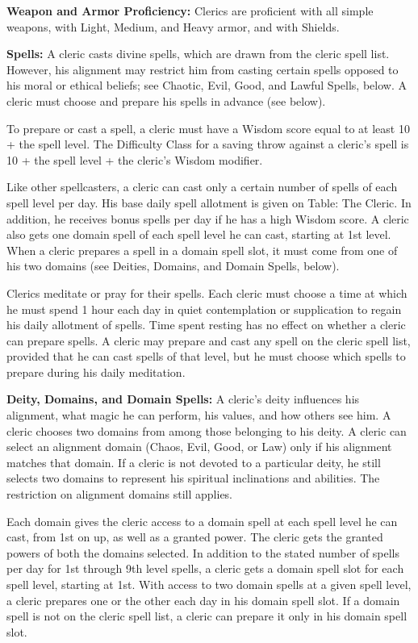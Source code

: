 \classfeatures

\textbf{Weapon and Armor Proficiency:} Clerics are proficient with all simple weapons, with Light, Medium, and Heavy armor, and with Shields.

\textbf{Spells:} A cleric casts divine spells, which are drawn from the cleric spell list. However, his alignment may restrict him from casting certain spells opposed to his moral or ethical beliefs; see Chaotic, Evil, Good, and Lawful Spells, below. A cleric must choose and prepare his spells in advance (see below).

To prepare or cast a spell, a cleric must have a Wisdom score equal to at least 10 + the spell level. The Difficulty Class for a saving throw against a cleric's spell is 10 + the spell level + the cleric's Wisdom modifier.

Like other spellcasters, a cleric can cast only a certain number of spells of each spell level per day. His base daily spell allotment is given on Table: The Cleric. In addition, he receives bonus spells per day if he has a high Wisdom score. A cleric also gets one domain spell of each spell level he can cast, starting at 1st level. When a cleric prepares a spell in a domain spell slot, it must come from one of his two domains (see Deities, Domains, and Domain Spells, below).

Clerics meditate or pray for their spells. Each cleric must choose a time at which he must spend 1 hour each day in quiet contemplation or supplication to regain his daily allotment of spells. Time spent resting has no effect on whether a cleric can prepare spells. A cleric may prepare and cast any spell on the cleric spell list, provided that he can cast spells of that level, but he must choose which spells to prepare during his daily meditation.

\textbf{Deity, Domains, and Domain Spells:} A cleric's deity influences his alignment, what magic he can perform, his values, and how others see him. A cleric chooses two domains from among those belonging to his deity. A cleric can select an alignment domain (Chaos, Evil, Good, or Law) only if his alignment matches that domain. If a cleric is not devoted to a particular deity, he still selects two domains to represent his spiritual inclinations and abilities. The restriction on alignment domains still applies.

Each domain gives the cleric access to a domain spell at each spell level he can cast, from 1st on up, as well as a granted power. The cleric gets the granted powers of both the domains selected. In addition to the stated number of spells per day for 1st through 9th level spells, a cleric gets a domain spell slot for each spell level, starting at 1st. With access to two domain spells at a given spell level, a cleric prepares one or the other each day in his domain spell slot. If a domain spell is not on the cleric spell list, a cleric can prepare it only in his domain spell slot.

